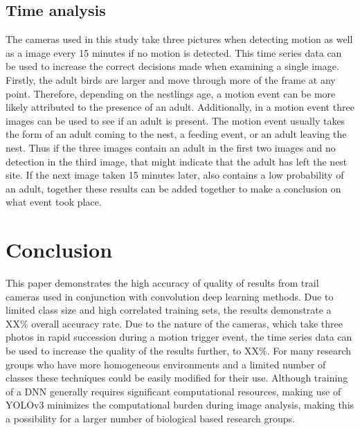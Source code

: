 \documentclass[journal]{IEEEtran}
\begin{document}
\subsection{Time analysis}\label{section:timeanalysis}
The cameras used in this study take three pictures when detecting motion as well as a image every 15 minutes if no motion is detected. This time series data can be used to increase the correct decisions made when examining a single image. Firstly, the adult birds are larger and move through more of the frame at any point. Therefore, depending on the nestlings age, a motion event can be more likely attributed to the presence of an adult. Additionally, in a motion event three images can be used to see if an adult is present. The motion event usually takes the form of an adult coming to the nest, a feeding event, or an adult leaving the nest. Thus if the three images contain an adult in the first two images and no detection in the third image, that might indicate that the adult has left the nest site. If the next image taken 15 minutes later, also contains a low probability of an adult, together these results can be added together to make a conclusion on what event took place.  






\section{Conclusion}\label{sectionconclusion}

This paper demonstrates the high accuracy of quality of results from trail cameras used in conjunction with convolution deep learning methods. Due to limited class size and high correlated training sets, the results demonstrate a XX\% overall accuracy rate. Due to the nature of the cameras, which take three photos in rapid succession during a motion trigger event, the time series data can be used to increase the quality of the results further, to XX\%. For many research groups who have more homogeneous environments and a limited number of classes these techniques could be easily modified for their use. Although training of a DNN generally requires significant computational resources, making use of YOLOv3 minimizes the computational burden during image analysis, making this a possibility for a larger number of biological based research groups. 



%


%
\end{document}

